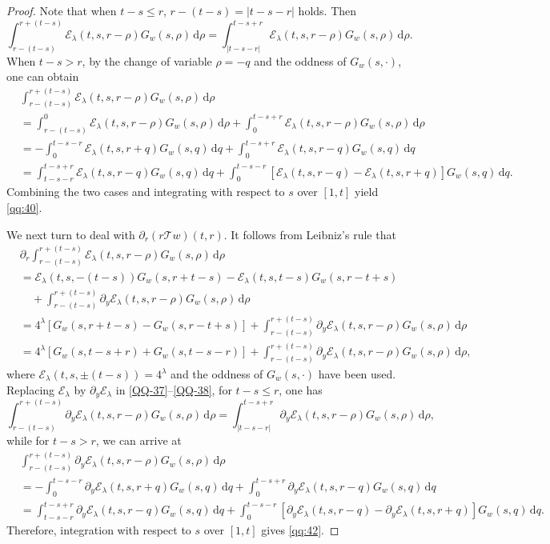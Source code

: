 \documentclass[11pt,twoside]{article}
\newcommand{\p}{\partial}
\newcommand{\dd}{\,\mathrm{d}}
\newcommand{\Ecal}{\mathcal E}
\newcommand{\Tcal}{\mathcal T}
\theoremstyle{plain}
\theoremstyle{definition}
\theoremstyle{remark}
\numberwithin{equation}{section}
\begin{document}
\begin{proof}
Note that when $t-s\leq r$,  $r-(t-s)=|t-s-r|$ holds. Then
\begin{equation}\label{QQ-37}
\int_{r-(t-s)}^{r+(t-s)}
\Ecal_\lambda(t,s,r-\rho)G_w(s,\rho)\dd\rho
=\int_{|t-s-r|}^{t-s+r}
\Ecal_\lambda(t,s,r-\rho)G_w(s,\rho)\dd\rho.
\end{equation}
When $t-s>r$,  by the change of variable $\rho=-q$ and the oddness of $G_w(s,\cdot)$, one can obtain
\begin{equation}\label{QQ-38}
\begin{aligned}
&\int_{r-(t-s)}^{r+(t-s)}
\Ecal_\lambda(t,s,r-\rho)G_w(s,\rho)\dd\rho\\
&=\int_{r-(t-s)}^0
\Ecal_\lambda(t,s,r-\rho)G_w(s,\rho)\dd\rho
+\int_0^{t-s+r}
\Ecal_\lambda(t,s,r-\rho)G_w(s,\rho)\dd\rho\\
&=-\int_0^{t-s-r}
\Ecal_\lambda(t,s,r+q)G_w(s,q)\dd q
+\int_0^{t-s+r}
\Ecal_\lambda(t,s,r-q)G_w(s,q)\dd q\\
&=\int_{t-s-r}^{t-s+r}
\Ecal_\lambda(t,s,r-q)G_w(s,q)\dd q+
\int_0^{t-s-r}
\left[
\Ecal_\lambda(t,s,r-q)
-\Ecal_\lambda(t,s,r+q)
\right]
G_w(s,q)\dd q.
\end{aligned}
\end{equation}
Combining the two cases and integrating with respect to $s$ over
$[1,t]$ yield \eqref{qq:40}.

We next turn to deal with $\p_r(r\Tcal w)(t,r)$. It follows from Leibniz's rule that
\[
\begin{aligned}
&\p_r
\int_{r-(t-s)}^{r+(t-s)}
\Ecal_\lambda(t,s,r-\rho)G_w(s,\rho)\dd\rho\\
&=\Ecal_\lambda(t,s,-(t-s))G_w(s,r+t-s)
-\Ecal_\lambda(t,s,t-s)G_w(s,r-t+s)\\
&\quad+
\int_{r-(t-s)}^{r+(t-s)}
\p_y\Ecal_\lambda(t,s,r-\rho)G_w(s,\rho)\dd\rho\\
&=4^\lambda
\left[
G_w(s,r+t-s)-G_w(s,r-t+s)
\right]+
\int_{r-(t-s)}^{r+(t-s)}
\p_y\Ecal_\lambda(t,s,r-\rho)G_w(s,\rho)\dd\rho\\
&=4^\lambda
\left[
G_w(s,t-s+r)+G_w(s,t-s-r)
\right]+
\int_{r-(t-s)}^{r+(t-s)}
\p_y\Ecal_\lambda(t,s,r-\rho)G_w(s,\rho)\dd\rho,
\end{aligned}
\]
where $\Ecal_\lambda(t,s,\pm(t-s))=4^\lambda$ and the oddness of
$G_w(s,\cdot)$ have been used.
Replacing $\Ecal_\lambda$ by $\p_y\Ecal_\lambda$ in
\eqref{QQ-37}--\eqref{QQ-38}, for $t-s\leq r$, one has
\[
\int_{r-(t-s)}^{r+(t-s)}
\p_y\Ecal_\lambda(t,s,r-\rho)G_w(s,\rho)\dd\rho
=\int_{|t-s-r|}^{t-s+r}
\p_y\Ecal_\lambda(t,s,r-\rho)G_w(s,\rho)\dd\rho,
\]
while for $t-s>r$, we can arrive at
\[
\begin{aligned}
&\int_{r-(t-s)}^{r+(t-s)}
\p_y\Ecal_\lambda(t,s,r-\rho)G_w(s,\rho)\dd\rho\\
&=
-\int_0^{t-s-r}
\p_y\Ecal_\lambda(t,s,r+q)G_w(s,q)\dd q
+
\int_0^{t-s+r}
\p_y\Ecal_\lambda(t,s,r-q)G_w(s,q)\dd q\\
&=
\int_{t-s-r}^{t-s+r}
\p_y\Ecal_\lambda(t,s,r-q)G_w(s,q)\dd q
+
\int_0^{t-s-r}
\left[
\p_y\Ecal_\lambda(t,s,r-q)
-
\p_y\Ecal_\lambda(t,s,r+q)
\right]
G_w(s,q)\dd q.
\end{aligned}
\]
Therefore, integration with respect to $s$ over $[1,t]$ gives
\eqref{qq:42}.
\end{proof}
\end{document}
